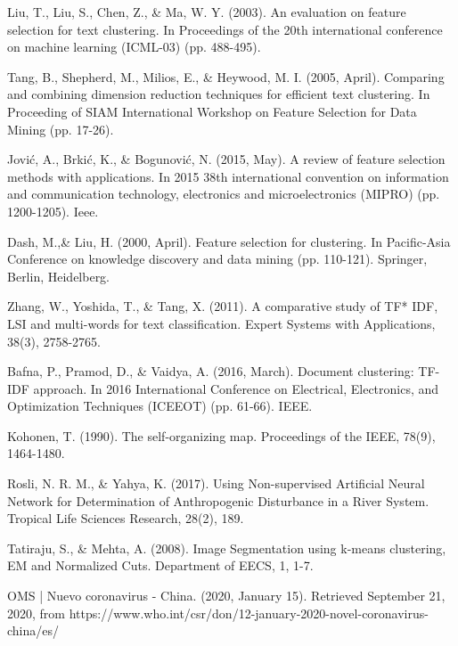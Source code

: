 \documentclass[10pt, a4paper]{article}
\begin{document}
\begin{thebibliography}{X}
 Liu, T., Liu, S., Chen, Z., \& Ma, W. Y. (2003). An evaluation on feature selection for text clustering. In Proceedings of the 20th international conference on machine learning (ICML-03) (pp. 488-495).

 Tang, B., Shepherd, M., Milios, E., \& Heywood, M. I. (2005, April). Comparing and combining dimension reduction techniques for efficient text clustering. In Proceeding of SIAM International Workshop on Feature Selection for Data Mining (pp. 17-26).

 Jović, A., Brkić, K., \& Bogunović, N. (2015, May). A review of feature selection methods with applications. In 2015 38th international convention on information and communication technology, electronics and microelectronics (MIPRO) (pp. 1200-1205). Ieee.

 Dash, M.,\& Liu, H. (2000, April). Feature selection for clustering. In Pacific-Asia Conference on knowledge discovery and data mining (pp. 110-121). Springer, Berlin, Heidelberg.

 Zhang, W., Yoshida, T., \& Tang, X. (2011). A comparative study of TF* IDF, LSI and multi-words for text classification. Expert Systems with Applications, 38(3), 2758-2765.

 Bafna, P., Pramod, D.,  \& Vaidya, A. (2016, March). Document clustering: TF-IDF approach. In 2016 International Conference on Electrical, Electronics, and Optimization Techniques (ICEEOT) (pp. 61-66). IEEE.

 Kohonen, T. (1990). The self-organizing map. Proceedings of the IEEE, 78(9), 1464-1480.

 Rosli, N. R. M., \& Yahya, K. (2017). Using Non-supervised Artificial Neural Network for Determination of Anthropogenic Disturbance in a River System. Tropical Life Sciences Research, 28(2), 189.

 Tatiraju, S., \& Mehta, A. (2008). Image Segmentation using k-means clustering, EM and Normalized Cuts. Department of EECS, 1, 1-7.

 OMS | Nuevo coronavirus - China. (2020, January 15). Retrieved September 21, 2020, from https://www.who.int/csr/don/12-january-2020-novel-coronavirus-china/es/


\end{thebibliography}
\end{document}
